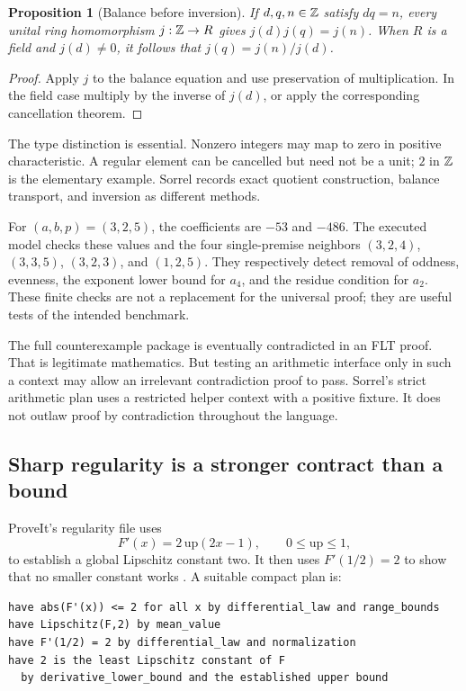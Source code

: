 \documentclass[11pt,a4paper]{article}
\numberwithin{equation}{section}
\newtheorem{proposition}[theorem]{Proposition}
\theoremstyle{definition}\newtheorem{definition}[theorem]{Definition}
\theoremstyle{remark}\newtheorem{remark}[theorem]{Remark}
\begin{document}
\begin{proposition}[Balance before inversion]\label{prop:balance}
If \(d,q,n\in\mathbb Z\) satisfy \(dq=n\), every unital ring homomorphism
\(j:\mathbb Z\to R\) gives \(j(d)j(q)=j(n)\). When \(R\) is a field and
\(j(d)\ne0\), it follows that \(j(q)=j(n)/j(d)\).
\end{proposition}
\begin{proof}
Apply \(j\) to the balance equation and use preservation of multiplication.
In the field case multiply by the inverse of \(j(d)\), or apply the
corresponding cancellation theorem.
\end{proof}

The type distinction is essential. Nonzero integers may map to zero in positive
characteristic. A regular element can be cancelled but need not be a unit;
\(2\) in \(\mathbb Z\) is the elementary example. Sorrel records exact quotient
construction, balance transport, and inversion as different methods.

For \((a,b,p)=(3,2,5)\), the coefficients are \(-53\) and \(-486\).
The executed model checks these values and the four single-premise neighbors
\((3,2,4)\), \((3,3,5)\), \((3,2,3)\), and \((1,2,5)\). They respectively
detect removal of oddness, evenness, the exponent lower bound for \(a_4\),
and the residue condition for \(a_2\). These finite checks are not a replacement
for the universal proof; they are useful tests of the intended benchmark.

The full counterexample package is eventually contradicted in an FLT proof.
That is legitimate mathematics. But testing an arithmetic interface only in
such a context may allow an irrelevant contradiction proof to pass. Sorrel's
strict arithmetic plan uses a restricted helper context with a positive
fixture. It does not outlaw proof by contradiction throughout the language.

\subsection{Sharp regularity is a stronger contract than a bound}
ProveIt's regularity file uses
\[
 F'(x)=2\,\mathrm{up}(2x-1),\qquad 0\le\mathrm{up}\le1,
\]
to establish a global Lipschitz constant two. It then uses
\(F'(1/2)=2\) to show that no smaller constant works \cite{regularity}.
A suitable compact plan is:
\begin{lstlisting}
have abs(F'(x)) <= 2 for all x by differential_law and range_bounds
have Lipschitz(F,2) by mean_value
have F'(1/2) = 2 by differential_law and normalization
have 2 is the least Lipschitz constant of F
  by derivative_lower_bound and the established upper bound
\end{lstlisting}
\end{document}
